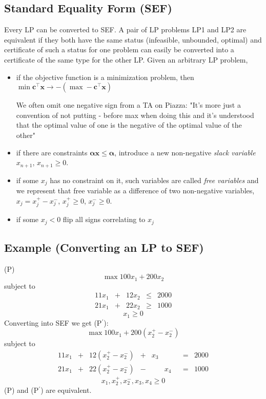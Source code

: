 \subsection{Standard Equality Form (SEF)}
Every LP can be converted to SEF. A pair of LP problems LP1 and LP2 are equivalent if they both have the
same status (infeasible, unbounded, optimal) and certificate of such a status for one problem can easily
be converted into a certificate of the same type for the other LP.
Given an arbitrary LP problem, 
\begin{itemize}
    \item if the objective function is a minimization problem, then 
    $\min \mathbf{c}^\top \mathbf{x}\rightarrow -(\max -\mathbf{c}^\top \mathbf{x})$
        \begin{remark}
        We often omit one negative sign
        from a TA on Piazza: "It's more just a convention of not putting - 
        before max when doing this and it's understood that the 
        optimal value of one is the negative of the optimal value of the other"
        \end{remark} 
    \item if there are constraints $\mathbf{\alpha}\mathbf{x}\le \mathbf{\alpha}$, introduce a new
    non-negative \emph{slack variable} $x_{n+1}$, $x_{n+1}\ge 0$.
    \item if some $x_j$ has no constraint on it, such variables are called \emph{free variables} and
    we represent that free variable as a difference of two non-negative variables,
    $x_j=x_j^+-x_j^-$, $x_j^+\ge 0$, $x_j^-\ge 0$.
    \item if some $x_j<0$ flip all signs correlating to $x_j$
\end{itemize}

\subsection{Example (Converting an LP to SEF)}
(P)
\[\max 100x_1+200x_2\]
subject to
\[
\begin{array}{ccccc}
    11x_1 & + & 12x_2 & \le & 2000\\
    21x_1 & + & 22x_2 & \ge & 1000
\end{array}
\]
\[x_1 \ge 0\]
Converting into SEF we get (P$^\prime$):
\[\max 100x_1+200(x_2^+-x_2^-)\]
subject to
\[
\begin{array}{ccccccccc}
    11x_1 & + & 12(x_2^+-x_2^-) & + & x_3 & & & = & 2000\\
    21x_1 & + & 22(x_2^+-x_2^-) & - & & x_4 & & = & 1000
\end{array}
\]
\[x_1,x_2^+,x_2^-,x_3,x_4\ge 0\]
(P) and (P$^\prime$) are equivalent.

